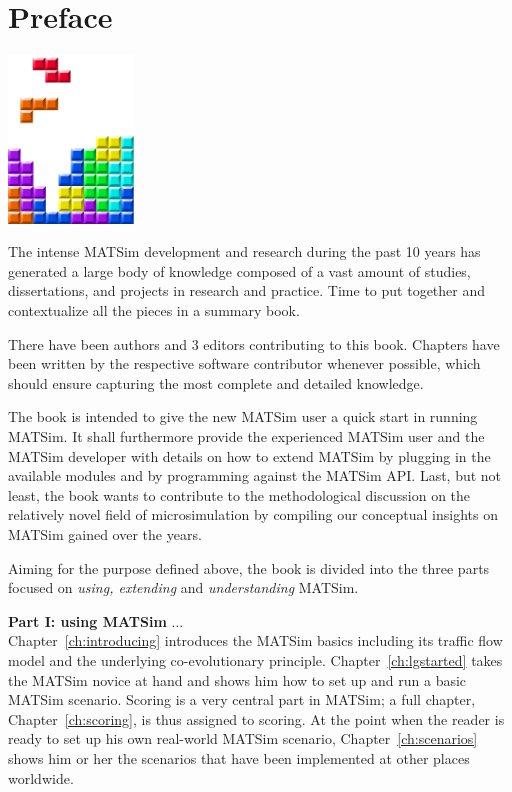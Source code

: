 \chapter*{Preface}

\begin{center} \includegraphics[width=0.25\textwidth, angle=0]{figures/MATSimBook.png} \end{center}

The intense MATSim development and research during the past 10 years has generated a large body of knowledge composed of a vast amount of studies, dissertations, and projects in research and practice. Time to put together and contextualize all the pieces in a summary book.

There have been  authors and 3 editors contributing to this book. Chapters have been written by the respective software contributor whenever possible, which should ensure capturing the most complete and detailed knowledge. 

The book is intended to give the new MATSim user a quick start in running MATSim. It shall furthermore provide the experienced MATSim user and the MATSim developer with details on how to extend MATSim by plugging in the available modules and by programming against the MATSim API. Last, but not least, the book wants to contribute to the methodological discussion on the relatively novel field of microsimulation by compiling our conceptual insights on MATSim gained over the years.

Aiming for the purpose defined above, the book is divided into the three parts focused on \emph{using, extending} and \emph{understanding} MATSim.

\textbf{Part I: using MATSim} ... \\
Chapter~\ref{ch:introducing} introduces the MATSim basics including its traffic flow model and the underlying co-evolutionary principle. Chapter~\ref{ch:lgstarted} takes the MATSim novice at hand and shows him how to set up and run a basic MATSim scenario. Scoring is a very central part in MATSim; a full chapter, Chapter~\ref{ch:scoring}, is thus assigned to scoring. At the point when the reader is ready to set up his own real-world MATSim scenario, Chapter~\ref{ch:scenarios} shows him or her the scenarios that have been implemented at other places worldwide. 

